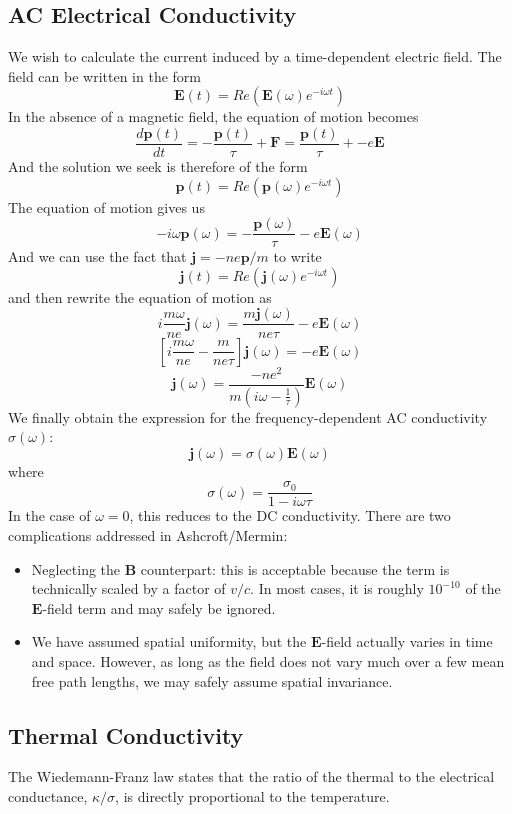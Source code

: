 \documentclass[10pt]{article}
\begin{document}
\subsection{AC Electrical Conductivity}
We wish to calculate the current induced by a time-dependent electric field. The field can be written in the form
$$
\textbf{E}(t) = Re(\textbf{E}(\omega)e^{-i\omega t})
$$
In the absence of a magnetic field, the equation of motion becomes
$$
\frac{d\textbf{p}(t)}{dt} =  - \frac{\textbf{p}(t)}{\tau} + \textbf{F} = \frac{\textbf{p}(t)}{\tau} + -e\textbf{E}
$$
And the solution we seek is therefore of the form
$$
\textbf{p}(t) = Re(\textbf{p}(\omega)e^{-i\omega t})
$$
The equation of motion gives us
$$
-i\omega \textbf{p}(\omega) = -\frac{\textbf{p}(\omega)}{\tau} - e\textbf{E}(\omega)
$$
And we can use the fact that $\textbf{j} = -ne\textbf{p}/m$ to write
$$
\textbf{j}(t) = Re(\textbf{j}(\omega)e^{-i\omega t})
$$
and then rewrite the equation of motion as
$$
i\frac{m\omega}{ne}\textbf{j}(\omega) = \frac{m\textbf{j}(\omega)}{ne\tau} - e\textbf{E}(\omega)
$$
$$
\left[ i\frac{m\omega}{ne} - \frac{m}{ne\tau} \right ]\textbf{j}(\omega) = - e\textbf{E}(\omega)
$$
$$
\textbf{j}(\omega) = \frac{-ne^{2}}{m(i\omega - \frac{1}{\tau})}\textbf{E}(\omega)
$$
We finally obtain the expression for the frequency-dependent AC conductivity $\sigma(\omega)$:
$$
\textbf{j}(\omega) = \sigma(\omega)\textbf{E}(\omega)
$$
where
$$
\sigma(\omega) = \frac{\sigma_{0}}{1-i\omega\tau}
$$
In the case of $\omega = 0$, this reduces to the DC conductivity.
There are two complications addressed in Ashcroft/Mermin:
\begin{itemize}
  \item Neglecting the $\textbf{B}$ counterpart: this is acceptable because the term is technically scaled
  by a factor of $v/c$. In most cases, it is roughly $10^{-10}$ of the $\textbf{E}$-field term and may safely be ignored.
  \item We have assumed spatial uniformity, but the $\textbf{E}$-field actually varies in time and space. However, as long as
  the field does not vary much over a few mean free path lengths, we may safely assume spatial invariance.
\end{itemize}

\subsection{Thermal Conductivity}
The Wiedemann-Franz law states that the ratio of the thermal to the electrical conductance, $\kappa / \sigma$, is
directly proportional to the temperature.
\end{document}
